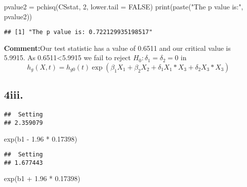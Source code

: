 \documentclass[
]{article}
\newenvironment{Shaded}{\begin{snugshade}}{\end{snugshade}}
\newcommand{\AttributeTok}[1]{\textcolor[rgb]{0.77,0.63,0.00}{#1}}
\newcommand{\CommentTok}[1]{\textcolor[rgb]{0.56,0.35,0.01}{\textit{#1}}}
\newcommand{\ConstantTok}[1]{\textcolor[rgb]{0.00,0.00,0.00}{#1}}
\newcommand{\DecValTok}[1]{\textcolor[rgb]{0.00,0.00,0.81}{#1}}
\newcommand{\FloatTok}[1]{\textcolor[rgb]{0.00,0.00,0.81}{#1}}
\newcommand{\FunctionTok}[1]{\textcolor[rgb]{0.00,0.00,0.00}{#1}}
\newcommand{\NormalTok}[1]{#1}
\newcommand{\OtherTok}[1]{\textcolor[rgb]{0.56,0.35,0.01}{#1}}
\newcommand{\SpecialCharTok}[1]{\textcolor[rgb]{0.00,0.00,0.00}{#1}}
\newcommand{\StringTok}[1]{\textcolor[rgb]{0.31,0.60,0.02}{#1}}
\begin{document}
\begin{Shaded}
\begin{Highlighting}[]
\NormalTok{pvalue2 }\OtherTok{=} \FunctionTok{pchisq}\NormalTok{(CSstat, }\DecValTok{2}\NormalTok{, }\AttributeTok{lower.tail =} \ConstantTok{FALSE}\NormalTok{)}
\FunctionTok{print}\NormalTok{(}\FunctionTok{paste}\NormalTok{(}\StringTok{"The p value is:"}\NormalTok{, pvalue2))}
\end{Highlighting}
\end{Shaded}

\begin{verbatim}
## [1] "The p value is: 0.722129935198517"
\end{verbatim}

\textbf{Comment:}Our test statistic has a value of 0.6511 and our
critical value is 5.9915. As 0.6511\textless5.9915 we fail to reject
\(H_0: \delta_1=\delta_2=0\) in \[
h_g(X,t)=h_{g0}(t)\exp(\beta_1 X_1+ \beta_2 X_2 + \delta_1 X_1*X_3 + \delta_2 X_3*X_3)
\]

\hypertarget{iii.}{%
\subsection{4iii.}\label{iii.}}

\begin{Shaded}
\end{Shaded}

\begin{verbatim}
##  Setting 
## 2.359079
\end{verbatim}

\begin{Shaded}
\begin{Highlighting}[]
\FunctionTok{exp}\NormalTok{(b1 }\SpecialCharTok{{-}} \FloatTok{1.96} \SpecialCharTok{*} \FloatTok{0.17398}\NormalTok{)}
\end{Highlighting}
\end{Shaded}

\begin{verbatim}
##  Setting 
## 1.677443
\end{verbatim}

\begin{Shaded}
\begin{Highlighting}[]
\FunctionTok{exp}\NormalTok{(b1 }\SpecialCharTok{+} \FloatTok{1.96} \SpecialCharTok{*} \FloatTok{0.17398}\NormalTok{)}
\end{Highlighting}
\end{Shaded}
\end{document}
